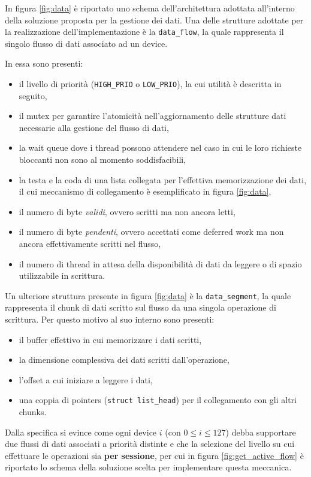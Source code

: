\documentclass{article}
\begin{document}
In figura \ref{fig:data} è riportato uno schema dell'architettura adottata all'interno della soluzione proposta per la gestione dei dati. Una delle strutture adottate per la realizzazione dell'implementazione è la \texttt{data\_flow}, la quale rappresenta il singolo flusso di dati associato ad un device.

In essa sono presenti:
\begin{itemize}
        \item il livello di priorità (\texttt{HIGH\_PRIO} o \texttt{LOW\_PRIO}), la cui utilità è descritta in seguito,
        \item il mutex per garantire l'atomicità nell'aggiornamento delle strutture dati necessarie alla gestione del flusso di dati,
        \item la wait queue dove i thread possono attendere nel caso in cui le loro richieste bloccanti non sono al momento soddisfacibili,
        \item la testa e la coda di una lista collegata per l'effettiva memorizzazione dei dati, il cui meccanismo di collegamento è esemplificato in figura \ref{fig:data},
        \item il numero di byte \textit{validi}, ovvero scritti ma non ancora letti,
        \item il numero di byte \textit{pendenti}, ovvero accettati come deferred work ma non ancora effettivamente scritti nel flusso,
        \item il numero di thread in attesa della disponibilità di dati da leggere o di spazio utilizzabile in scrittura.
\end{itemize}

Un ulteriore struttura presente in figura \ref{fig:data} è la \texttt{data\_segment}, la quale rappresenta il chunk di dati scritto sul flusso da una singola operazione di scrittura. Per questo motivo al suo interno sono presenti:
\begin{itemize}
        \item il buffer effettivo in cui memorizzare i dati scritti,
        \item la dimensione complessiva dei dati scritti dall'operazione,
        \item l'offset a cui iniziare a leggere i dati,
        \item una coppia di pointers (\texttt{struct list\_head}) per il collegamento con gli altri chunks.
\end{itemize}

Dalla specifica si evince come ogni device $i$ (con $0\leq i \leq 127$) debba supportare due flussi di dati associati a priorità distinte e che la selezione del livello su cui effettuare le operazioni sia \textbf{per sessione}, per cui in figura \ref{fig:get_active_flow} è riportato lo schema della soluzione scelta per implementare questa meccanica.
\end{document}

